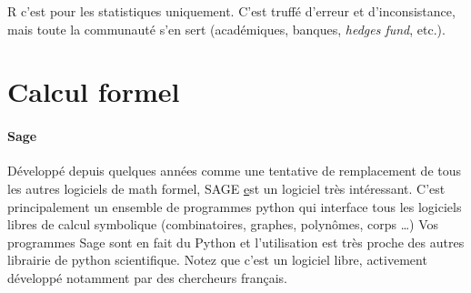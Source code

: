 
R c'est pour les statistiques uniquement. C'est truffé d'erreur et d'inconsistance, mais
toute la communauté s'en sert (académiques, banques, \textit{hedges fund}, etc.).

\section{Calcul formel}


\paragraph{Sage}

Développé depuis quelques années comme une tentative de remplacement de tous les
autres logiciels de math formel, SAGE \href{http://www.sagemath.org/} est un logiciel très intéressant.
C'est principalement un ensemble de programmes python qui interface tous les logiciels
libres de calcul symbolique (combinatoires, graphes, polynômes, corps \dots)
Vos programmes Sage sont en fait du Python et l'utilisation est très proche des 
autres librairie de python scientifique.
Notez que c'est un logiciel libre, activement développé notamment par des chercheurs français.



